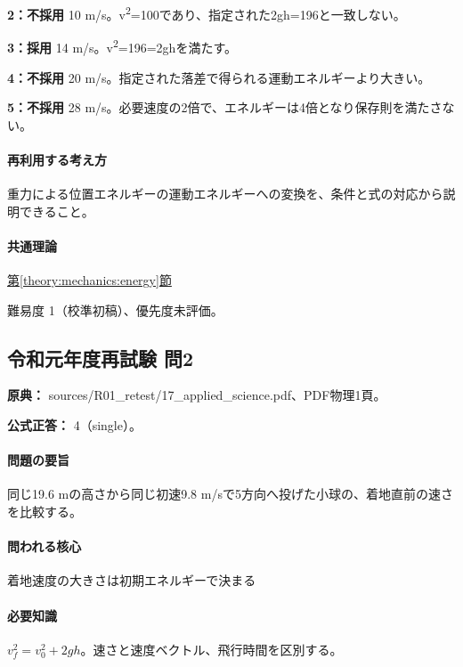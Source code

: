 \noindent\textbf{2：不採用} 10 m/s。v\textsuperscript{2}=100であり、指定された2gh=196と一致しない。\par

\noindent\textbf{3：採用} 14 m/s。v\textsuperscript{2}=196=2ghを満たす。\par

\noindent\textbf{4：不採用} 20 m/s。指定された落差で得られる運動エネルギーより大きい。\par

\noindent\textbf{5：不採用} 28 m/s。必要速度の2倍で、エネルギーは4倍となり保存則を満たさない。\par

\paragraph{再利用する考え方} 重力による位置エネルギーの運動エネルギーへの変換を、条件と式の対応から説明できること。

\paragraph{共通理論} \hyperref[theory:mechanics:energy]{第\ref*{theory:mechanics:energy}節}

\par 難易度 1（校準初稿）、優先度未評価。

\subsection{令和元年度再試験 問2}
\label{q:r01-ret-applied-02}

\noindent\textbf{原典：} sources/R01\_retest/17\_applied\_science.pdf、PDF物理1頁。

\textbf{公式正答：} 4（single）。

\paragraph{問題の要旨} 同じ19.6 mの高さから同じ初速9.8 m/sで5方向へ投げた小球の、着地直前の速さを比較する。

\paragraph{問われる核心} 着地速度の大きさは初期エネルギーで決まる

\paragraph{必要知識} \(v_f^2=v_0^2+2gh\)。速さと速度ベクトル、飛行時間を区別する。

